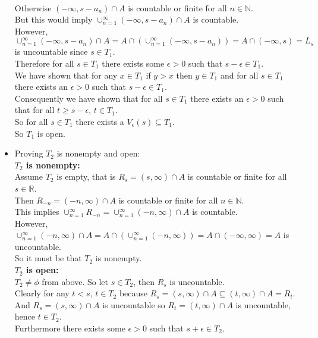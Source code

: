\documentclass{article}
\begin{document}
\begin{center}
\begin{itemize}
        \\Otherwise $(-\infty, s - a_n)\cap A$ is countable or finite for all $n\in\mathbb{N}$.
        \\But this would imply $\cup _{n=1}^{\infty} (-\infty, s - a_n)\cap A$ is countable.
        \\However, $\cup _{n=1}^{\infty} (-\infty, s - a_n)\cap A = A\cap (\cup _{n=1}^{\infty} (-\infty, s - a_n)) = A\cap (-\infty, s) = L_s$ is uncountable since $s\in T_1$.
        \\Therefore for all $s\in T_1$ there exists some $\epsilon > 0$ such that $s -\epsilon\in T_1$.
        \\We have shown that for any $x\in T_1$ if $y > x$ then $y\in T_1$ and for all $s\in T_1$ there exists an $\epsilon > 0$ such that $s -\epsilon\in T_1$.
        \\Consequently we have shown that for all $s\in T_1$ there exists an $\epsilon > 0$ such that for all $t\geq s -\epsilon$, $t\in T_1$.
        \\So for all $s\in T_1$ there exists a $V_{\epsilon} (s)\subseteq T_1$.
        \\So $T_1$ is open.
        \item Proving $T_2$ is nonempty and open:
        \\\textbf{$T_2$ is nonempty:}
        \\Assume $T_2$ is empty, that is $R_s = (s, \infty)\cap A$ is countable or finite for all $s\in\mathbb{R}$.
        \\Then $R_{-n} = (-n, \infty)\cap A$ is countable or finite for all $n\in\mathbb{N}$.
        \\This implies $\cup _{n=1}^{\infty} R_{-n} =\cup _{n=1}^{\infty} (-n, \infty)\cap A$ is countable.
        \\However, $\cup _{n=1}^{\infty} (-n, \infty)\cap A = A\cap (\cup _{n=1}^{\infty} (-n, \infty)) = A\cap (-\infty, \infty) = A$ is uncountable.
        \\So it must be that $T_2$ is nonempty.
        \\\textbf{$T_2$ is open:}
        \\$T_2\neq\phi$ from above. So let $s\in T_2$, then $R_s$ is uncountable.
        \\Clearly for any $t < s$, $t\in T_2$ because $R_s = (s, \infty)\cap A\subseteq (t, \infty)\cap A = R_t$.
        \\And $R_s = (s, \infty)\cap A$ is uncountable so $R_t = (t, \infty)\cap A$ is uncountable, hence $t\in T_2$.
        \\Furthermore there exists some $\epsilon > 0$ such that $s +\epsilon\in T_2$.

\end{itemize}
\end{center}
\end{document}
